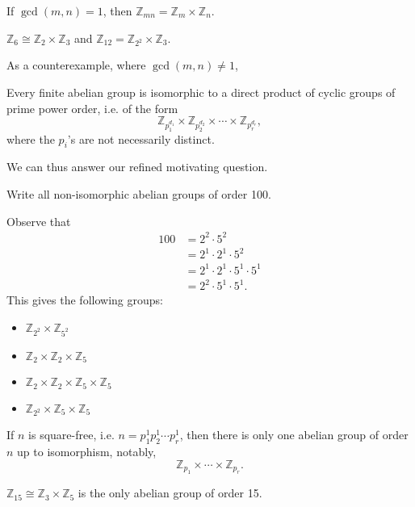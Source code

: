 \begin{theorem}
	If $\gcd(m,n)=1$, then $\mathbb Z_{mn}=\mathbb Z_m\times\mathbb Z_n$.
\end{theorem}

\begin{example}
	$\mathbb Z_6\cong\mathbb Z_2\times\mathbb Z_3$ and $\mathbb Z_{12}=\mathbb Z_{2^2}\times\mathbb Z_3$.

	As a counterexample, where $\gcd(m,n)\neq 1$, 
\end{example}

\begin{theorem}
	Every finite abelian group is isomorphic to a direct product of cyclic groups of prime power order, i.e. of the form
	$$\mathbb Z_{p_1^{d_1}}\times \mathbb Z_{p_2^{d_2}}\times\cdots\times \mathbb Z_{p_r^{d_r}},$$
	where the $p_i$'s are not necessarily distinct.
\end{theorem}

We can thus answer our refined motivating question.

\begin{example}
	Write all non-isomorphic abelian groups of order 100.

	\begin{solution}
		Observe that
		\begin{align*}
			100&=2^2\cdot 5^2\\
			&=2^1\cdot 2^1\cdot 5^2\\
			&=2^1\cdot 2^1\cdot 5^1\cdot 5^1\\
			&=2^2\cdot 5^1\cdot 5^1.
		\end{align*}
		This gives the following groups:
		\begin{itemize}
			\item $\mathbb Z_{2^2}\times\mathbb Z_{5^2}$
			\item $\mathbb Z_2\times\mathbb Z_2\times\mathbb Z_5$
			\item $\mathbb Z_2\times \mathbb Z_2\times \mathbb Z_5\times \mathbb Z_5$
			\item $\mathbb Z_{2^2}\times \mathbb Z_5\times \mathbb Z_5$
		\end{itemize}
	\end{solution}
\end{example}

\begin{corollary}
	If $n$ is square-free, i.e. $n=p_1^1p_2^1\cdots p_r^1$, then there is only one abelian group of order $n$ up to isomorphism, notably,
	$$\mathbb Z_{p_1}\times\cdots\times\mathbb Z_{p_r}.$$
\end{corollary}

\begin{example}
	$\mathbb Z_{15}\cong\mathbb Z_3\times\mathbb Z_5$ is the only abelian group of order 15.
\end{example}